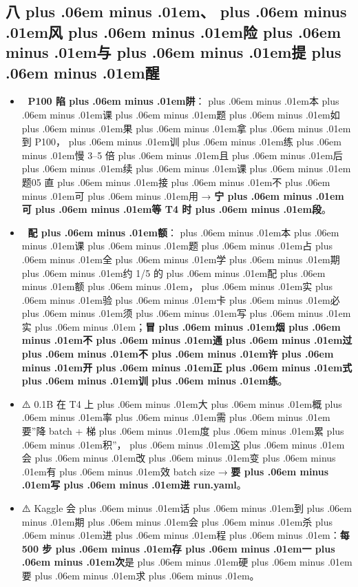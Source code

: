 \documentclass[
]{article}
\providecommand{\tightlist}{%
  \setlength{\itemsep}{0pt}\setlength{\parskip}{0pt}}
\def\zh#1{{\zhfont #1}}
\def\sym#1{{\symfont #1}}
\def\emo#1{{\emofont #1}}
\def\zhglue{\hskip0pt plus .06em minus .01em}
\begin{document}
\subsection{\zh{八\zhglue 、\zhglue 风\zhglue 险\zhglue 与\zhglue 提\zhglue 醒}}\label{ux516bux98ceux9669ux4e0eux63d0ux9192}

\begin{itemize}
\tightlist
\item
  \emo{🚨} \textbf{P100 \zh{陷\zhglue 阱}}\zh{：\zhglue 本\zhglue 课\zhglue 题\zhglue 如\zhglue 果\zhglue 拿\zhglue 到} P100\zh{，\zhglue 训\zhglue 练\zhglue 慢} 3--5 \zh{倍\zhglue 且\zhglue 后\zhglue 续\zhglue 课\zhglue 题}05 \zh{直\zhglue 接\zhglue 不\zhglue 可\zhglue 用} \sym{→} \textbf{\zh{宁\zhglue 可\zhglue 等} T4 \zh{时\zhglue 段}}\zh{。}
\item
  \emo{🚨} \textbf{\zh{配\zhglue 额}}\zh{：\zhglue 本\zhglue 课\zhglue 题\zhglue 占\zhglue 全\zhglue 学\zhglue 期\zhglue 约} 1/5 \zh{的\zhglue 配\zhglue 额\zhglue ，\zhglue 实\zhglue 验\zhglue 卡\zhglue 必\zhglue 须\zhglue 写\zhglue 实\zhglue ；}\textbf{\zh{冒\zhglue 烟\zhglue 不\zhglue 通\zhglue 过\zhglue 不\zhglue 许\zhglue 开\zhglue 正\zhglue 式\zhglue 训\zhglue 练}}\zh{。}
\item
  \sym{⚠️} 0.1B \zh{在} T4 \zh{上\zhglue 大\zhglue 概\zhglue 率\zhglue 需\zhglue 要}''\zh{降} batch + \zh{梯\zhglue 度\zhglue 累\zhglue 积}''\zh{，\zhglue 这\zhglue 会\zhglue 改\zhglue 变\zhglue 有\zhglue 效} batch size \sym{→} \textbf{\zh{要\zhglue 写\zhglue 进} run.yaml}\zh{。}
\item
  \sym{⚠️} Kaggle \zh{会\zhglue 话\zhglue 到\zhglue 期\zhglue 会\zhglue 杀\zhglue 进\zhglue 程\zhglue ：}\textbf{\zh{每} 500 \zh{步\zhglue 存\zhglue 一\zhglue 次}}\zh{是\zhglue 硬\zhglue 要\zhglue 求\zhglue 。}
\end{itemize}
\end{document}
